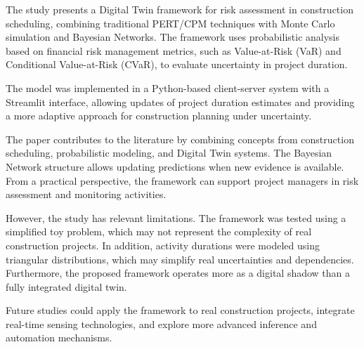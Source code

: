 The study presents a Digital Twin framework for risk assessment in construction scheduling, combining traditional PERT/CPM techniques with Monte Carlo simulation and Bayesian Networks. The framework uses probabilistic analysis based on financial risk management metrics, such as Value-at-Risk (VaR) and Conditional Value-at-Risk (CVaR), to evaluate uncertainty in project duration.

The model was implemented in a Python-based client-server system with a Streamlit interface, allowing updates of project duration estimates and providing a more adaptive approach for construction planning under uncertainty.

The paper contributes to the literature by combining concepts from construction scheduling, probabilistic modeling, and Digital Twin systems. The Bayesian Network structure allows updating predictions when new evidence is available. From a practical perspective, the framework can support project managers in risk assessment and monitoring activities.

However, the study has relevant limitations. The framework was tested using a simplified toy problem, which may not represent the complexity of real construction projects. In addition, activity durations were modeled using triangular distributions, which may simplify real uncertainties and dependencies. Furthermore, the proposed framework operates more as a digital shadow than a fully integrated digital twin.

Future studies could apply the framework to real construction projects, integrate real-time sensing technologies, and explore more advanced inference and automation mechanisms.

